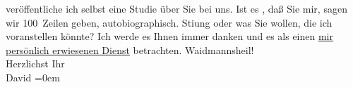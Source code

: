 \begin{ledgroupsized}[t]{13cm}
                    veröffentliche ich selbst eine Studie über Sie bei uns. Ist es \label{K_L00500_2v}\label{K_L00500_2h}, daß Sie mir, sagen wir 100 Zeilen geben,
                    autobiographisch. Sti{\geminationm}ung oder was Sie wollen, die
                    ich voranstellen könnte? Ich werde {\pb}es Ihnen immer danken und es als einen \uline{mir
                        persönlich erwiesenen Dienst} betrachten.\pend
           \pstart
           Waidmannsheil!{\\[\baselineskip]}Herzlichst Ihr{\\[\baselineskip]}\spacefill\mbox{David}\pend
           \leftskip=0em{}
         
         \endnumbering{}\end{ledgroupsized}  \newcommand{\dateiname}{L00500}\newcommand{\titel}{Jakob Julius David an Arthur Schnitzler, [5. 10. 1895]}\newcommand{\editorInnen}{Martin Anton Müller und Gerd-Hermann Susen}
      